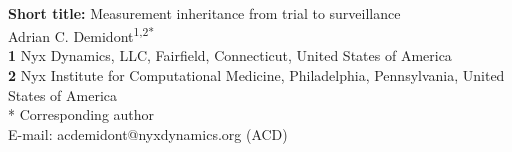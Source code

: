 \documentclass[10pt,letterpaper]{article}
\begin{document}
\vspace*{0.2in}

\begin{flushleft}
{\Large
\textbf{}
}
\newline
\\
\textbf{Short title:} Measurement inheritance from trial to surveillance
\\
Adrian C. Demidont\textsuperscript{1,2*}
\\
\bigskip
\textbf{1} Nyx Dynamics, LLC, Fairfield, Connecticut, United States of America
\\
\textbf{2} Nyx Institute for Computational Medicine, Philadelphia, Pennsylvania, United States of America
\\
\bigskip
* Corresponding author
\\
E-mail: acdemidont@nyxdynamics.org (ACD)

\end{flushleft}
\end{document}

